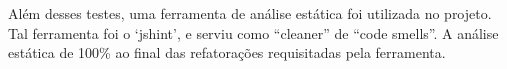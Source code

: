 Além desses testes, uma ferramenta de análise estática foi utilizada no projeto. Tal ferramenta 
foi o ‘jshint’, e serviu como “cleaner” de “code smells”. A análise estática de 100\% ao final 
das refatorações requisitadas pela ferramenta.

















